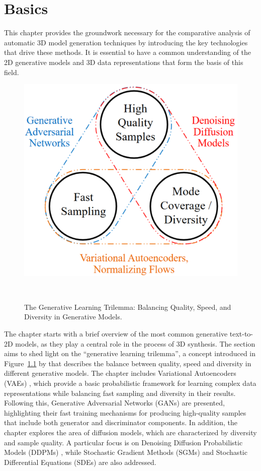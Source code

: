 \chapter{Basics}\label{ch:basics}

This chapter provides the groundwork necessary for the comparative analysis of automatic 3D model generation techniques by introducing the key technologies that drive these methods. It is essential to have a common understanding of the 2D generative models and 3D data representations that form the basis of this field.

\begin{figure}[ht]
  \centering
  \includegraphics[width=.4\columnwidth]{figures/BasicTrilemma.png}
  \caption{The Generative Learning Trilemma: Balancing Quality, Speed, and Diversity in Generative Models.~\citep{xiao2022tackling}}~\label{fig:generativeTrilemma}
\end{figure}

The chapter starts with a brief overview of the most common generative text-to-2D models, as they play a central role in the process of 3D synthesis. The section aims to shed light on the ``generative learning trilemma'', a concept introduced in Figure~\ref{fig:generativeTrilemma} by \citeauthor{xiao2022tackling} that describes the balance between quality, speed and diversity in different generative models. The chapter includes Variational Autoencoders (VAEs) \citep{kingmaVAE,rezendeVAE}, which provide a basic probabilistic framework for learning complex data representations while balancing fast sampling and diversity in their results. Following this, Generative Adversarial Networks (GANs) \citep{goodfellowGAN} are presented, highlighting their fast training mechanisms for producing high-quality samples that include both generator and discriminator components. In addition, the chapter explores the area of diffusion models, which are characterized by diversity and sample quality. A particular focus is on Denoising Diffusion Probabilistic Models (DDPMs) \citep{hoDDPMs,sohlDDPM}, while Stochastic Gradient Methods (SGMs) \citep{song2019SGM} and Stochastic Differential Equations (SDEs) \citep{song2020score,song2021maximum} are also addressed. 

